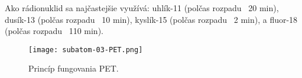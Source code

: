 \documentclass[../../main.tex]{subfiles}
\begin{document}
Ako rádionuklid sa najčastejšie využívá: uhlík-11 (polčas rozpadu ~20 min), dusík-13 (polčas rozpadu ~10 min), kyslík-15 (polčas rozpadu ~2 min), a fluor-18 (polčas rozpadu ~110 min).

\begin{figure}[!h]
\texttt{[image: subatom-03-PET.png]}
\centering
\caption{Princíp fungovania PET.}
\label{sf3:fig:pet}
\end{figure}
\end{document}
